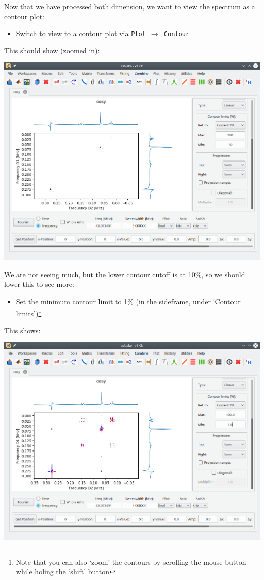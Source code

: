 \documentclass[11pt,a4paper]{article}
\begin{document}
Now that we have processed both dimension, we want to view the spectrum as a contour plot:
\begin{itemize}
  \item Switch to view to a contour plot via \texttt{Plot $\longrightarrow$ Contour}
\end{itemize}
This should show (zoomed in):
\begin{center}
\includegraphics[width=0.8\linewidth]{Figs/Fig2.png}
\end{center}
We are not seeing much, but the lower contour cutoff is at 10\%, so we should lower this to see
more:
\begin{itemize}
  \item Set the minimum contour limit to 1\% (in the sideframe, under `Contour
	 limits')\footnote{Note that you can also `zoom' the contours by scrolling the mouse button while
	 holing the `shift' button}
\end{itemize}
This shows:
\begin{center}
\includegraphics[width=0.8\linewidth]{Figs/Fig3.png}
\end{center}
\end{document}
